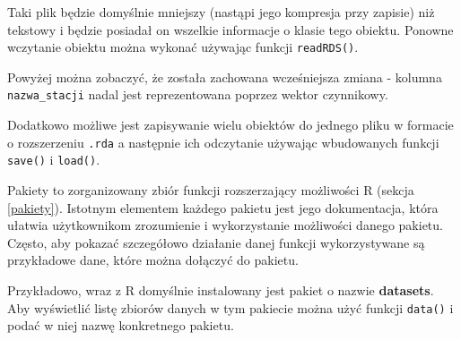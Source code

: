 \documentclass[paper=6in:9in,pagesize=pdftex,headinclude=on,footinclude=on,10pt]{scrbook}
\makeatletter
\newenvironment{Shaded}{\begin{snugshade}}{\end{snugshade}}
\newcommand{\CommentTok}[1]{\textcolor[rgb]{0.56,0.35,0.01}{\textit{#1}}}
\newcommand{\KeywordTok}[1]{\textcolor[rgb]{0.13,0.29,0.53}{\textbf{#1}}}
\newcommand{\NormalTok}[1]{#1}
\newcommand{\StringTok}[1]{\textcolor[rgb]{0.31,0.60,0.02}{#1}}
\newenvironment{kframe}{%
\medskip{}
\setlength{\fboxsep}{.8em}
 \def\at@end@of@kframe{}%
 \ifinner\ifhmode%
  \def\at@end@of@kframe{\end{minipage}}%
  \begin{minipage}{\columnwidth}%
 \fi\fi%
 \def\FrameCommand##1{\hskip\@totalleftmargin \hskip-\fboxsep
 \colorbox{shadecolor}{##1}\hskip-\fboxsep
     \hskip-\linewidth \hskip-\@totalleftmargin \hskip\columnwidth}%
 \MakeFramed {\advance\hsize-\width
   \@totalleftmargin\z@ \linewidth\hsize
   \@setminipage}}%
 {\par\unskip\endMakeFramed%
 \at@end@of@kframe}
\newenvironment{rmdblock}[1]
  {
  \begin{itemize}
  \renewcommand{\labelitemi}{
    \raisebox{-.7\height}[0pt][0pt]{
      {\setkeys{Gin}{width=3em,keepaspectratio}\texttt{[image: images/\#1]}}
    }
  }
  \setlength{\fboxsep}{1em}
  \begin{kframe}
  \item
  }
  {
  \end{kframe}
  \end{itemize}
  }
\newenvironment{rmdinfo}
  {\begin{rmdblock}{compass}}
  {\end{rmdblock}}
\makeatother
\begin{document}
Taki plik będzie domyślnie mniejszy (nastąpi jego kompresja przy zapisie) niż tekstowy i będzie posiadał on wszelkie informacje o klasie tego obiektu.
Ponowne wczytanie obiektu można wykonać używając funkcji \texttt{readRDS()}.

\begin{Shaded}
\end{Shaded}

Powyżej można zobaczyć, że została zachowana wcześniejsza zmiana - kolumna \texttt{nazwa\_stacji} nadal jest reprezentowana poprzez wektor czynnikowy.

\begin{rmdinfo}
\begin{rmdinfo}

Dodatkowo możliwe jest zapisywanie wielu obiektów do jednego pliku w formacie o rozszerzeniu \texttt{.rda} a następnie ich odczytanie używając wbudowanych funkcji \texttt{save()} i \texttt{load()}.

\end{rmdinfo}
\end{rmdinfo}

Pakiety to zorganizowany zbiór funkcji rozszerzający możliwości R (sekcja \ref{pakiety}).
Istotnym elementem każdego pakietu jest jego dokumentacja, która ułatwia użytkownikom zrozumienie i wykorzystanie możliwości danego pakietu.
Często, aby pokazać szczegółowo działanie danej funkcji wykorzystywane są przykładowe dane, które można dołączyć do pakietu.

Przykładowo, wraz z R domyślnie instalowany jest pakiet o nazwie \textbf{datasets}.
Aby wyświetlić listę zbiorów danych w tym pakiecie można użyć funkcji \texttt{data()} i podać w niej nazwę konkretnego pakietu.
\end{document}
